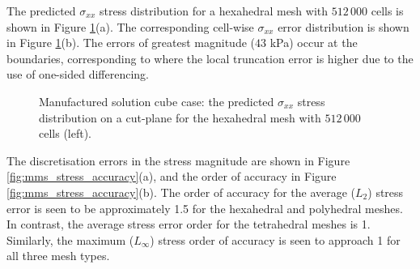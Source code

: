 \documentclass[sn-mathphys,Numbered]{sn-jnl}%
\begin{document}
The predicted $\sigma_{xx}$ stress distribution for a hexahedral mesh with $512\,000$ cells is shown in Figure \ref{fig:mms_stress}(a).
The corresponding cell-wise $\sigma_{xx}$ error distribution is shown in Figure \ref{fig:mms_stress}(b).
The errors of greatest magnitude ($43$ kPa) occur at the boundaries, corresponding to where the local truncation error is higher due to the use of one-sided differencing.
\begin{figure}[htbp]
	\centering
	\caption{Manufactured solution cube case: the predicted $\sigma_{xx}$ stress distribution on a cut-plane for the hexahedral mesh with $512\,000$ cells (left).}
	\label{fig:mms_stress}
\end{figure}
The discretisation errors in the stress magnitude are shown in Figure \ref{fig:mms_stress_accuracy}(a), and the order of accuracy in Figure \ref{fig:mms_stress_accuracy}(b).
The order of accuracy for the average ($L_2$) stress error is seen to be approximately 1.5 for the hexahedral and polyhedral meshes.
In contrast, the average stress error order for the tetrahedral meshes is 1.
Similarly, the maximum ($L_\infty$) stress order of accuracy is seen to approach 1 for all three mesh types.
\end{document}
